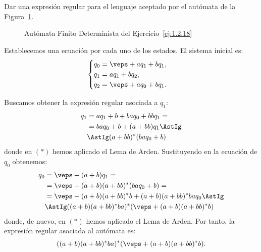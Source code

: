 \begin{ejercicio} \label{ej:1.2.18}
    Dar una expresión regular para el lenguaje aceptado por el autómata de la Figura~\ref{fig:ej:1.2.18}.
    \begin{figure}
        \centering
        \caption{Autómata Finito Determinista del Ejercicio~\ref{ej:1.2.18}}
        \label{fig:ej:1.2.18}
    \end{figure}

    Establecemos una ecuación por cada uno de los estados. El sistema inicial es:
    \begin{equation*}
        \begin{cases}
            q_0 = \veps + aq_1 + bq_1, \\
            q_1 = aq_1 + bq_2, \\
            q_2 = \veps + aq_0 + bq_1.
        \end{cases}
    \end{equation*}

    Buscamos obtener la expresión regular asociada a $q_1$:
    \begin{align*}
        q_1 &= aq_1 + b + baq_0 +bbq_1=\\
        &= baq_0 + b + (a+bb)q_1\AstIg\\
        &\AstIg (a+bb)^*(baq_0 + b)
    \end{align*}
    donde en $(\ast)$ hemos aplicado el Lema de Arden. Sustituyendo en la ecuación de $q_0$ obtenemos:
    \begin{align*}
        q_0 &= \veps + (a+b)q_1 =\\
        &= \veps + (a+b)(a+bb)^*(baq_0 + b) =\\
        &= \veps + (a+b)(a+bb)^*b + (a+b)(a+bb)^*baq_0 \AstIg\\
        &\AstIg ((a+b)(a+bb)^*ba)^*(\veps + (a+b)(a+bb)^*b)
    \end{align*}
    donde, de nuevo, en $(\ast)$ hemos aplicado el Lema de Arden. Por tanto, la expresión regular asociada al autómata es:
    \begin{align*}
        ((a+b)(a+bb)^*ba)^*(\veps + (a+b)(a+bb)^*b).
    \end{align*}
\end{ejercicio}


